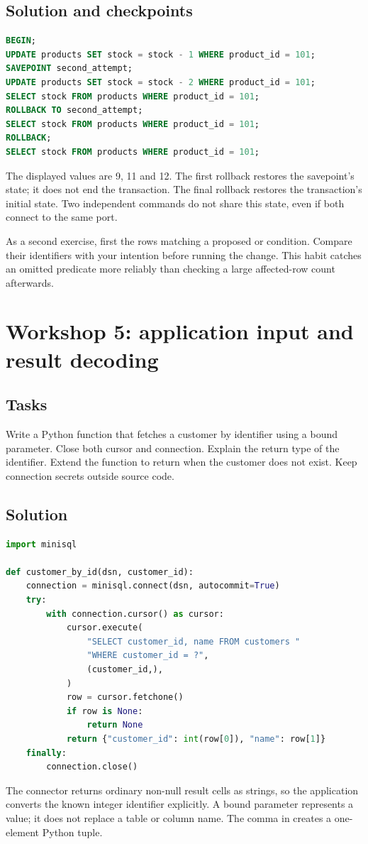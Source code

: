 \subsection{Solution and checkpoints}
\begin{lstlisting}[language=SQL]
BEGIN;
UPDATE products SET stock = stock - 1 WHERE product_id = 101;
SAVEPOINT second_attempt;
UPDATE products SET stock = stock - 2 WHERE product_id = 101;
SELECT stock FROM products WHERE product_id = 101;
ROLLBACK TO second_attempt;
SELECT stock FROM products WHERE product_id = 101;
ROLLBACK;
SELECT stock FROM products WHERE product_id = 101;
\end{lstlisting}
The displayed values are 9, 11 and 12. The first rollback restores the
savepoint's state; it does not end the transaction. The final rollback
restores the transaction's initial state. Two independent 
commands do not share this state, even if both connect to the same port.

As a second exercise, first  the rows matching a proposed
 or  condition. Compare their identifiers with
your intention before running the change. This habit catches an omitted
predicate more reliably than checking a large affected-row count afterwards.

\section{Workshop 5: application input and result decoding}
\subsection{Tasks}
Write a Python function that fetches a customer by identifier using a bound
parameter. Close both cursor and connection. Explain the return type of the
identifier. Extend the function to return  when the customer does
not exist. Keep connection secrets outside source code.

\subsection{Solution}
\begin{lstlisting}[language=Python]
import minisql

def customer_by_id(dsn, customer_id):
    connection = minisql.connect(dsn, autocommit=True)
    try:
        with connection.cursor() as cursor:
            cursor.execute(
                "SELECT customer_id, name FROM customers "
                "WHERE customer_id = ?",
                (customer_id,),
            )
            row = cursor.fetchone()
            if row is None:
                return None
            return {"customer_id": int(row[0]), "name": row[1]}
    finally:
        connection.close()
\end{lstlisting}
The connector returns ordinary non-null result cells as strings, so the
application converts the known integer identifier explicitly. A bound
parameter represents a value; it does not replace a table or column name.
The comma in  creates a one-element Python tuple.

